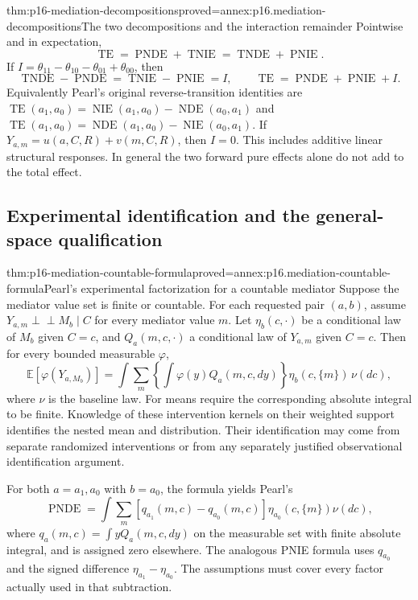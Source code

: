 \begin{hbtheorem}{thm:p16-mediation-decompositions}{proved=annex:p16.mediation-decompositions}{The two decompositions and the interaction remainder}
Pointwise and in expectation,
\[
 \operatorname{TE}=\operatorname{PNDE}+\operatorname{TNIE}
                  =\operatorname{TNDE}+\operatorname{PNIE}.
\]
If \(I=\theta_{11}-\theta_{10}-\theta_{01}+\theta_{00}\), then
\[
 \operatorname{TNDE}-\operatorname{PNDE}
 =\operatorname{TNIE}-\operatorname{PNIE}=I,
 \qquad\operatorname{TE}=\operatorname{PNDE}+\operatorname{PNIE}+I.
\]
Equivalently Pearl's original reverse-transition identities are
\(\operatorname{TE}(a_1,a_0)=\operatorname{NIE}(a_1,a_0)
-\operatorname{NDE}(a_0,a_1)\) and
\(\operatorname{TE}(a_1,a_0)=\operatorname{NDE}(a_1,a_0)
-\operatorname{NIE}(a_0,a_1)\).
If \(Y_{a,m}=u(a,C,R)+v(m,C,R)\), then \(I=0\).
This includes additive linear structural responses. In general the two
forward pure effects alone do not add to the total effect.
\end{hbtheorem}

\subsection{Experimental identification and the general-space qualification}

\begin{hbtheorem}{thm:p16-mediation-countable-formula}{proved=annex:p16.mediation-countable-formula}{Pearl's experimental factorization for a countable mediator}
Suppose the mediator value set is finite or countable. For each requested
pair \((a,b)\), assume
\(Y_{a,m}\mathrel{\perp\!\!\!\perp}M_b\mid C\) for every mediator
value \(m\). Let \(\eta_b(c,\cdot)\) be a conditional law of \(M_b\)
given \(C=c\), and \(Q_a(m,c,\cdot)\) a conditional law of \(Y_{a,m}\)
given \(C=c\). Then for every bounded measurable \(\varphi\),
\[
 \mathbb E[\varphi(Y_{a,M_b})]
 =\int\sum_m\left\{\int\varphi(y)Q_a(m,c,dy)\right\}
                  \eta_b(c,\{m\})\,\nu(dc),                 \tag{MF}
\]
where \(\nu\) is the baseline law. For means require the corresponding
absolute integral to be finite. Knowledge of these intervention kernels
on their weighted support identifies the nested mean and distribution.
Their identification may come from separate randomized interventions or
from any separately justified observational identification argument.

For both \(a=a_1,a_0\) with \(b=a_0\), the formula yields Pearl's
\[
 \operatorname{PNDE}=\int\sum_m
 [q_{a_1}(m,c)-q_{a_0}(m,c)]\eta_{a_0}(c,\{m\})\nu(dc),
\]
where \(q_a(m,c)=\int yQ_a(m,c,dy)\) on the measurable set with
finite absolute integral, and is assigned zero elsewhere. The analogous PNIE formula
uses \(q_{a_0}\) and the signed difference \(\eta_{a_1}-\eta_{a_0}\).
The assumptions must cover every factor actually used in that subtraction.
\end{hbtheorem}

